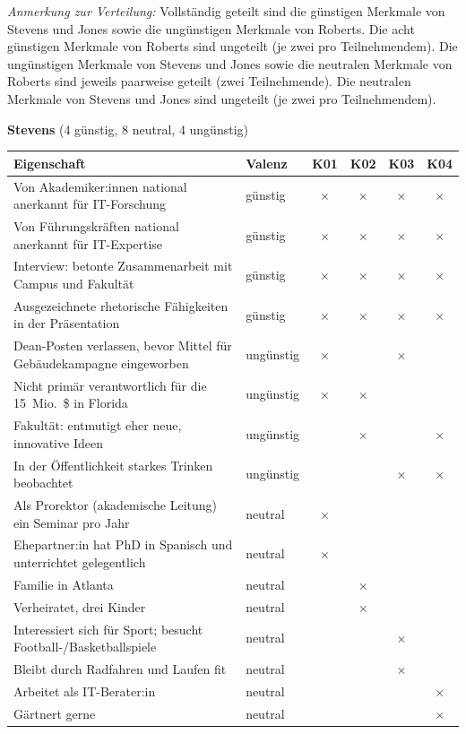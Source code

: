 \vspace{0.75em}
\noindent\textit{Anmerkung zur Verteilung:}
Vollständig geteilt sind die günstigen Merkmale von Stevens und Jones sowie die ungünstigen Merkmale
von Roberts.
Die acht günstigen Merkmale von Roberts sind ungeteilt (je zwei pro Teilnehmendem).
Die ungünstigen Merkmale von Stevens und Jones sowie die neutralen Merkmale von Roberts sind jeweils
paarweise geteilt (zwei Teilnehmende).
Die neutralen Merkmale von Stevens und Jones sind ungeteilt (je zwei pro Teilnehmendem).

\clearpage
\footnotesize
\noindent\textbf{Stevens} (4 günstig, 8 neutral, 4 ungünstig)
\begin{center}
  \setlength{\tabcolsep}{4pt}
  \begin{tabular}{@{}p{}lcccc@{}}
    \toprule
    Eigenschaft & Valenz & K01 & K02 & K03 & K04 \\
    \midrule
    Von Akademiker:innen national anerkannt für IT-Forschung
    & günstig & $\times$ & $\times$ & $\times$ & $\times$ \\
    Von Führungskräften national anerkannt für IT-Expertise
    & günstig & $\times$ & $\times$ & $\times$ & $\times$ \\
    Interview: betonte Zusammenarbeit mit Campus und Fakultät
    & günstig & $\times$ & $\times$ & $\times$ & $\times$ \\
    Ausgezeichnete rhetorische Fähigkeiten in der Präsentation
    & günstig & $\times$ & $\times$ & $\times$ & $\times$ \\
    \midrule
    Dean-Posten verlassen, bevor Mittel für Gebäudekampagne eingeworben
    & ungünstig & $\times$ &  & $\times$ &  \\
    Nicht primär verantwortlich für die 15~Mio.\ \$ in Florida
    & ungünstig & $\times$ & $\times$ &  &  \\
    Fakultät: entmutigt eher neue, innovative Ideen
    & ungünstig &  & $\times$ &  & $\times$ \\
    In der Öffentlichkeit starkes Trinken beobachtet
    & ungünstig &  &  & $\times$ & $\times$ \\
    \midrule
    Als Prorektor (akademische Leitung) ein Seminar pro Jahr
    & neutral & $\times$ &  &  &  \\
    Ehepartner:in hat PhD in Spanisch und unterrichtet gelegentlich
    & neutral & $\times$ &  &  &  \\
    Familie in Atlanta
    & neutral &  & $\times$ &  &  \\
    Verheiratet, drei Kinder
    & neutral &  & $\times$ &  &  \\
    Interessiert sich für Sport; besucht Football-/Basketballspiele
    & neutral &  &  & $\times$ &  \\
    Bleibt durch Radfahren und Laufen fit
    & neutral &  &  & $\times$ &  \\
    Arbeitet als IT-Berater:in
    & neutral &  &  &  & $\times$ \\
    Gärtnert gerne
    & neutral &  &  &  & $\times$ \\
    \bottomrule
  \end{tabular}
\end{center}

